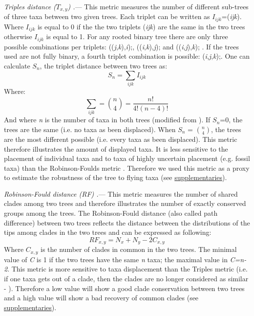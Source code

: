 \documentclass[12pt,letterpaper]{article}
\renewcommand{\subsubsection}[1]{%
\vspace{2ex}
\noindent
\textit{#1.}---}
\begin{document}
\subsubsection{Triples distance ($T_{x,y}$) \citep{dobson1975triplets}}
This metric measures the number of different sub-trees of three taxa between two given trees.
Each triplet can be written as $I_{ijk}$=(\textit{ijk}).
Where $I_{ijk}$ is equal to 0 if the the two triplets (\textit{ijk}) are the same in the two trees otherwise $I_{ijk}$ is equal to 1.
For any rooted binary tree there are only three possible combinations per triplets: ((\textit{j},\textit{k}),\textit{i});, ((\textit{i},\textit{k}),\textit{j}); and ((\textit{i},\textit{j}),\textit{k}); \citep{johnson1998}.
If the trees used are not fully binary, a fourth triplet combination is possible: (\textit{i},\textit{j},\textit{k});.
One can calculate $S_n$, the triplet distance between two trees as:
\begin{equation}
S_n = \sum_{ijk} I_{ijk}
\end{equation}
Where:
\begin{equation}
\sum_{ijk} = \binom{n}{4} = \frac{n!}{4!(n-4)!}
\end{equation}
And where \textit{n} is the number of taxa in both trees (modified from \citet{critchlowthe1996}).
If $S_n$=0, the trees are the same (i.e. no taxa as been displaced).
When $S_n$ = $\binom{n}{4}$, the trees are the most different possible (i.e. every taxa as been displaced).
This metric therefore illustrates the amount of displayed taxa.
It is less sensitive to the placement of individual taxa and to taxa of highly uncertain placement (e.g. fossil taxa) than the Robinson-Foulds metric \citep{critchlowthe1996,johnson1998,wiensmissing2003}.
Therefore we used this metric as a proxy to estimate the robustness of the tree to flying taxa (see \hyperref[supplementaries]{supplementaries}).

\subsubsection{Robinson-Fould distance (\textit{RF}) \citep{RF1981}}
This metric measures the number of shared clades among two trees and therefore illustrates the number of exactly conserved groups among the trees.
The Robinson-Fould distance (also called path difference) between two trees reflects the distance between the distributions of the tips among clades in the two trees \citep{RF1981} and can be expressed as following:
\begin{equation}
RF_{x,y} = N_{x} + N_{y} - 2C_{x,y}
\end{equation}
Where $C_{x,y}$ is the number of clades in common in the two trees.
The minimal value of \textit{C} is 1 if the two trees have the same \textit{n} taxa; the maximal value in \textit{C=n-2}.
This metric is more sensitive to taxa displacement than the Triples metric (i.e. if one taxa gets out of a clade, then the clades are no longer considered as similar - \citet{critchlowthe1996,johnson1998,wiensmissing2003}).
Therefore a low value will show a good clade conservation between two trees and a high value will show a bad recovery of common clades (see \hyperref[supplementaries]{supplementaries}).
\end{document}
